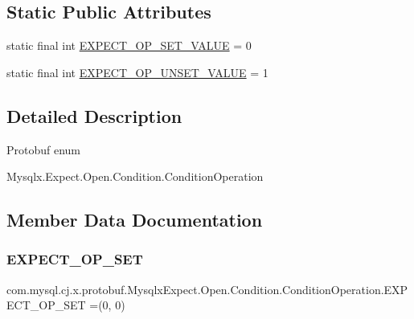 \subsection*{Static Public Attributes}
\begin{DoxyCompactItemize}
\item 
static final int \mbox{\hyperlink{enumcom_1_1mysql_1_1cj_1_1x_1_1protobuf_1_1_mysqlx_expect_1_1_open_1_1_condition_1_1_condition_operation_a8d5858263c68a41260982044487ca3ff}{E\+X\+P\+E\+C\+T\+\_\+\+O\+P\+\_\+\+S\+E\+T\+\_\+\+V\+A\+L\+UE}} = 0
\item 
static final int \mbox{\hyperlink{enumcom_1_1mysql_1_1cj_1_1x_1_1protobuf_1_1_mysqlx_expect_1_1_open_1_1_condition_1_1_condition_operation_a6648d724f37b7901ba2e64e9a4968cc1}{E\+X\+P\+E\+C\+T\+\_\+\+O\+P\+\_\+\+U\+N\+S\+E\+T\+\_\+\+V\+A\+L\+UE}} = 1
\end{DoxyCompactItemize}


\subsection{Detailed Description}
Protobuf enum
\begin{DoxyCode}
Mysqlx.Expect.Open.Condition.ConditionOperation 
\end{DoxyCode}
 

\subsection{Member Data Documentation}
\mbox{\label{enumcom_1_1mysql_1_1cj_1_1x_1_1protobuf_1_1_mysqlx_expect_1_1_open_1_1_condition_1_1_condition_operation_af7ff7aeb56ef9c3b991dffe432c2b75c}} 
\subsubsection{\texorpdfstring{E\+X\+P\+E\+C\+T\+\_\+\+O\+P\+\_\+\+S\+ET}{EXPECT\_OP\_SET}}
{\footnotesize\ttfamily com.\+mysql.\+cj.\+x.\+protobuf.\+Mysqlx\+Expect.\+Open.\+Condition.\+Condition\+Operation.\+E\+X\+P\+E\+C\+T\+\_\+\+O\+P\+\_\+\+S\+ET =(0, 0)}

